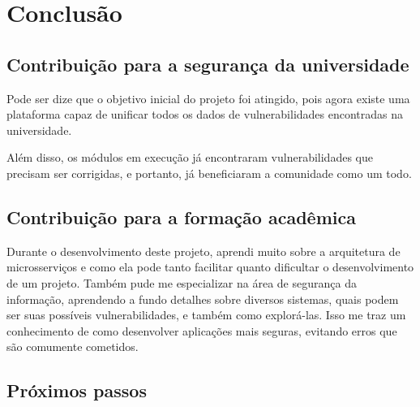 \chapter{Conclusão}
\label{cap:conclusao}

\section{Contribuição para a segurança da universidade}

Pode ser dize que o objetivo inicial do projeto foi atingido, pois agora existe uma plataforma capaz de unificar todos os dados de vulnerabilidades encontradas na universidade.

Além disso, os módulos em execução já encontraram vulnerabilidades que precisam ser corrigidas, e portanto, já beneficiaram a comunidade como um todo.


\section{Contribuição para a formação acadêmica}

Durante o desenvolvimento deste projeto, aprendi muito sobre a arquitetura de microsserviços e como ela pode tanto facilitar quanto dificultar o desenvolvimento de um projeto. 
Também pude me especializar na área de segurança da informação, aprendendo a fundo detalhes sobre diversos sistemas, quais podem ser suas possíveis vulnerabilidades, e também como explorá-las. Isso me traz um conhecimento de como desenvolver aplicações mais seguras, evitando erros que são comumente cometidos.





\section{Próximos passos}

